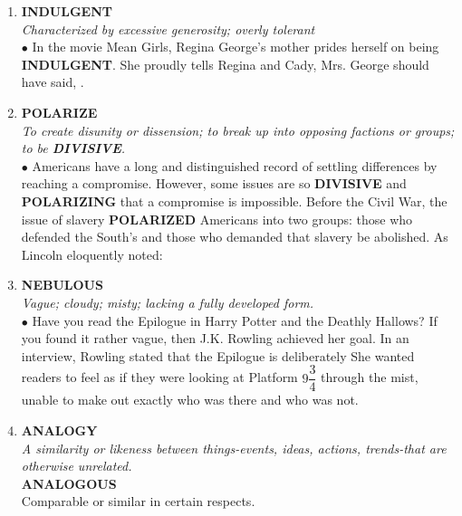 \documentclass{book}
\begin{document}
\begin{enumerate}
\item \textbf{INDULGENT}\\
\textit{Characterized by excessive generosity; overly tolerant}\\

$\bullet$ In the movie Mean Girls, Regina George's mother prides herself on being \textbf{INDULGENT}. She proudly tells Regina and Cady,  Mrs. George should have said, .

\item \textbf{POLARIZE}\\
\textit{To create disunity or dissension; to break up into opposing factions or groups;\\ to be \textbf{DIVISIVE}.}\\

$\bullet$ Americans have a long and distinguished record of settling differences by reaching a compromise. However, some issues are so \textbf{DIVISIVE} and \textbf{POLARIZING} that a compromise is impossible.  Before the Civil War, the issue of slavery \textbf{POLARIZED} Americans into two groups: those who defended the South's  and those who demanded that slavery be abolished. As Lincoln eloquently noted: 

\item \textbf{NEBULOUS}\\ 
\textit{Vague; cloudy; misty; lacking a fully developed form.}\\

$\bullet$ Have you read the Epilogue in Harry Potter and the Deathly Hallows? If you found it rather vague, then J.K. Rowling achieved her goal. In an interview, Rowling stated that the Epilogue is deliberately  She wanted readers to feel as if they were looking at Platform $9\dfrac{3}{4}$ through the mist, unable to make out exactly who was there and who was not.

\item \textbf{ANALOGY}\\
\textit{ A similarity or likeness between things-events, ideas, actions, trends-that are otherwise unrelated.}\\
\textbf{ANALOGOUS}\\Comparable or similar in certain respects.\\
 

\end{enumerate}
\end{document}
